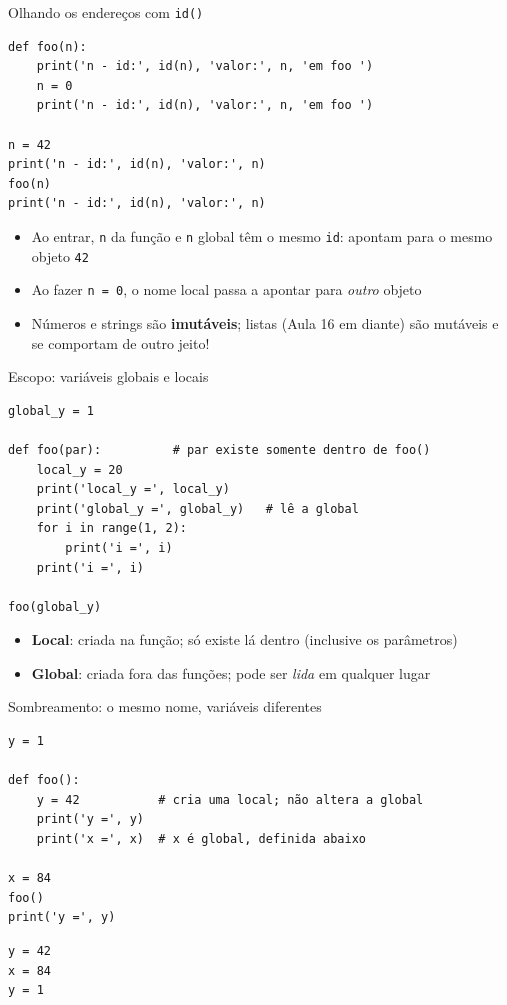 \documentclass[aspectratio=169,10pt,t]{beamer}
\begin{document}
\begin{frame}[fragile]{Olhando os endereços com \texttt{id()}}
\begin{lstlisting}[basicstyle=\ttfamily\scriptsize]
def foo(n):
    print('n - id:', id(n), 'valor:', n, 'em foo ')
    n = 0
    print('n - id:', id(n), 'valor:', n, 'em foo ')

n = 42
print('n - id:', id(n), 'valor:', n)
foo(n)
print('n - id:', id(n), 'valor:', n)
\end{lstlisting}
  \begin{itemize}
    \item Ao entrar, \texttt{n} da função e \texttt{n} global têm o \alert{mesmo \texttt{id}}: apontam para o mesmo objeto \texttt{42}
    \item Ao fazer \texttt{n = 0}, o nome local passa a apontar para \emph{outro} objeto
    \item Números e strings são \textbf{imutáveis}; listas (Aula 16 em diante) são mutáveis e se comportam de outro jeito!
  \end{itemize}
\end{frame}

\begin{frame}[fragile]{Escopo: variáveis globais e locais}
\begin{lstlisting}
global_y = 1

def foo(par):          # par existe somente dentro de foo()
    local_y = 20
    print('local_y =', local_y)
    print('global_y =', global_y)   # lê a global
    for i in range(1, 2):
        print('i =', i)
    print('i =', i)

foo(global_y)
\end{lstlisting}
  \begin{itemize}
    \item \textbf{Local}: criada na função; só existe lá dentro (inclusive os parâmetros)
    \item \textbf{Global}: criada fora das funções; pode ser \emph{lida} em qualquer lugar
  \end{itemize}
\end{frame}

\begin{frame}[fragile]{Sombreamento: o mesmo nome, variáveis diferentes}
\begin{lstlisting}
y = 1

def foo():
    y = 42           # cria uma local; não altera a global
    print('y =', y)
    print('x =', x)  # x é global, definida abaixo

x = 84
foo()
print('y =', y)
\end{lstlisting}
\begin{lstlisting}[style=saida]
y = 42
x = 84
y = 1
\end{lstlisting}
\end{frame}
\end{document}
